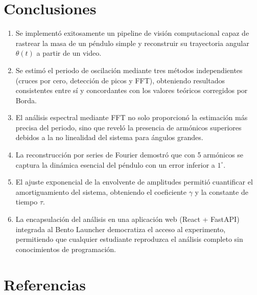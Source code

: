 \documentclass[12pt,a4paper]{article}
\begin{document}
\section{Conclusiones}

\begin{enumerate}
    \item Se implementó exitosamente un pipeline de visión computacional capaz de rastrear la masa de un péndulo simple y reconstruir su trayectoria angular $\theta(t)$ a partir de un video.

    \item Se estimó el periodo de oscilación mediante tres métodos independientes (cruces por cero, detección de picos y FFT), obteniendo resultados consistentes entre sí y concordantes con los valores teóricos corregidos por Borda.

    \item El análisis espectral mediante FFT no solo proporcionó la estimación más precisa del periodo, sino que reveló la presencia de armónicos superiores debidos a la no linealidad del sistema para ángulos grandes.

    \item La reconstrucción por series de Fourier demostró que con 5 armónicos se captura la dinámica esencial del péndulo con un error inferior a $1^{\circ}$.

    \item El ajuste exponencial de la envolvente de amplitudes permitió cuantificar el amortiguamiento del sistema, obteniendo el coeficiente $\gamma$ y la constante de tiempo $\tau$.

    \item La encapsulación del análisis en una aplicación web (React + FastAPI) integrada al Bento Launcher democratiza el acceso al experimento, permitiendo que cualquier estudiante reproduzca el análisis completo sin conocimientos de programación.

\end{enumerate}

\section*{Referencias}
\end{document}
